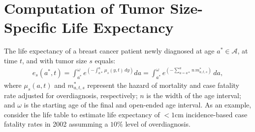 \documentclass[11pt,letterpaper]{article}
\theoremstyle{plain}
\theoremstyle{remark}
\numberwithin{equation}{section}
\begin{document}
\section{Computation of Tumor Size-Specific Life Expectancy}
The life expectancy of a breast cancer patient newly diagnosed at age
$a^*\in\mathcal{A}$, at time $t$, and with tumor size $s$ equals:
\begin{eqnarray}
 e_s(a^*,t)=\int_{a^*}^{\omega} e^{\left( -\int_{a*}^{a}\mu_s(y,t)\,dy \right)}da =\int_{a^*}^{\omega} e^{\left(-\sum_{a=a*}^{a}n\,m^*_{a,t,s}\right)}\,da ,
\end{eqnarray} 
where $\mu_s(a,t)$ and $m^*_{a,t,s}$ represent the hazard of mortality
and case fatality rate adjusted for overdiagnosis, respectively; $n$
is the width of the age interval; and $\omega$ is the starting age of
the final and open-ended age interval.  As an example, consider the
life table to estimate life expectancy of $<1$cm incidence-based case
fatality rates in 2002 assumming a $10\%$ level of overdiagnosis.
\end{document}

